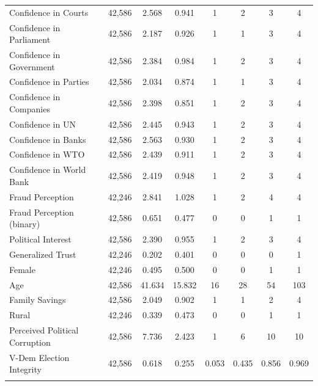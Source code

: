 \documentclass[11pt, ngerman,english,a4]{article}
\begin{document}
\begin{table}[!htbp]
\begin{tabular}{@{\extracolsep{5pt}}lccccccc}
Confidence in Courts & 42,586 & 2.568 & 0.941 & 1 & 2 & 3 & 4 \\ 
Confidence in Parliament & 42,586 & 2.187 & 0.926 & 1 & 1 & 3 & 4 \\ 
Confidence in Government & 42,586 & 2.384 & 0.984 & 1 & 2 & 3 & 4 \\ 
Confidence in Parties & 42,586 & 2.034 & 0.874 & 1 & 1 & 3 & 4 \\ 
Confidence in Companies & 42,586 & 2.398 & 0.851 & 1 & 2 & 3 & 4 \\ 
Confidence in UN & 42,586 & 2.445 & 0.943 & 1 & 2 & 3 & 4 \\ 
Confidence in Banks & 42,586 & 2.563 & 0.930 & 1 & 2 & 3 & 4 \\ 
Confidence in WTO & 42,586 & 2.439 & 0.911 & 1 & 2 & 3 & 4 \\ 
Confidence in World Bank & 42,586 & 2.419 & 0.948 & 1 & 2 & 3 & 4 \\ 
Fraud Perception & 42,246 & 2.841 & 1.028 & 1 & 2 & 4 & 4 \\ 
Fraud Perception (binary) & 42,586 & 0.651 & 0.477 & 0 & 0 & 1 & 1 \\ 
Political Interest  & 42,586 & 2.390 & 0.955 & 1 & 2 & 3 & 4 \\ 
Generalized Trust  & 42,246 & 0.202 & 0.401 & 0 & 0 & 0 & 1 \\ 
Female & 42,246 & 0.495 & 0.500 & 0 & 0 & 1 & 1 \\ 
Age & 42,586 & 41.634 & 15.832 & 16 & 28 & 54 & 103 \\ 
Family Savings & 42,586 & 2.049 & 0.902 & 1 & 1 & 2 & 4 \\ 
Rural & 42,246 & 0.339 & 0.473 & 0 & 0 & 1 & 1 \\ 
Perceived Political Corruption & 42,586 & 7.736 & 2.423 & 1 & 6 & 10 & 10 \\ 
V-Dem Election Integrity & 42,586 & 0.618 & 0.255 & 0.053 & 0.435 & 0.856 & 0.969 \\ 
\hline \\[-1.8ex] 
\end{tabular} 
\end{table} 
\end{document}
